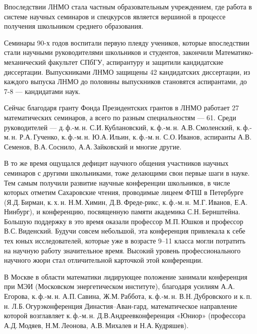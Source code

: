 \ms\abz Впоследствии ЛНМО стала частным образовательным учреждением, где работа в системе научных семинаров и спецкурсов является вершиной в процессе получения школьником среднего образования. 

\ms\abz Семинары 90-х годов воспитали первую плеяду учеников, которые впоследствии стали научными руководителями школьников и студентов, закончили Математико-механический факультет СПбГУ, аспирантуру и защитили кандидатские диссертации. Выпускниками ЛНМО защищены 42 кандидатских диссертации, из каждого выпуска ЛНМО до половины выпускников становятся аспирантами, до 7-8 — кандидатами наук.

\ms\abz Сейчас благодаря гранту Фонда Президентских грантов в ЛНМО работает 27 математических семинаров, а всего по разным специальностям — 61. Среди руководителей — д.\,ф.-м.\,н. С.И.\,Кублановский, к.\,ф.-м.\,н. А.В.\,Смоленский, к.\,ф.-м.\,н. Р.А.\,Гученко, к.\,ф.-м.\,н. Ю.А.\,Ильин, к.\,ф.-м.\,н. С.О.\,Иванов, аспиранты А.В.\,Семенов, В.А.\,Соснило, А.А.\,Зайковский   и многие другие. 

\ms\abz В то же время ощущался дефицит научного общения участников научных семинаров с другими школьниками, тоже делающими свои первые шаги в науке. Тем самым получили развитие научные конференции школьников, в числе которых отметим Сахаровские чтения, проводимые лицеем ФТШ в Петербурге (Я.Д.\,Бирман, к.\,х.\,н. Н.М.\,Химин, Д.В.\,Фреде-\linebreak рикс, к.\,ф.-м.\,н. М.Г.\,Иванов, Е.А.\,Нинбург), и конференцию, посвященную памяти академика С.Н.\,Бернштейна. Большую поддержку в это время оказали профессор М.П.\,Юшков и профессор В.С.\,Виденский. Будучи совсем небольшой, эта конференция привлекала к себе тех юных исследователей, которые уже в возрасте 9–11 класса могли потратить на научную работу значительное время. Высокий уровень профессионального научного жюри стал отличительной карточкой этой конференции.

\ms\abz В Москве в области математики лидирующее положение занимали конференция при МЭИ (Московском энергетическом институте), благодаря усилиям А.А.\,Егорова, к.\,ф.-м.\,н. А.П.\,Савина, Ж.М.\,Раббота, к.\,ф.-м.\,н. В.Н.\,Дубровского и к.\,п.\,н. Л.Б.\,Огурэ\scolon конференция Династия–Аван-\linebreak гард, математическое направление которой возглавляет к.\,ф.-м.\,н. Д.В.\linebreak Андреев\scolon конференция «Юниор» (профессора А.Д.\,Модяев, Н.М.\,Леонова, А.В.\,Михалев и Н.А.\,Кудряшев).

